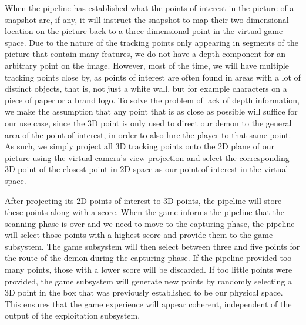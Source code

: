 
When the pipeline has established what the points of interest in the picture of a snapshot are, if any, it will instruct the snapshot to map their two dimensional location on the picture back to a three dimensional point in the virtual game space.
Due to the nature of the tracking points only appearing in segments of the picture that contain many features, we do not have a depth component for an arbitrary point on the image.
However, most of the time, we will have multiple tracking points close by, as points of interest are often found in areas with a lot of distinct objects, that is, not just a white wall, but for example characters on a piece of paper or a brand logo.
To solve the problem of lack of depth information, we make the assumption that any point that is as close as possible will suffice for our use case, since the 3D point is only used to direct our demon to the general area of the point of interest, in order to also lure the player to that same point.
As such, we simply project all 3D tracking points onto the 2D plane of our picture using the virtual camera's view-projection and select the corresponding 3D point of the closest point in 2D space as our point of interest in the virtual space.

After projecting its 2D points of interest to 3D points, the pipeline will store these points along with a score.
When the game informs the pipeline that the scanning phase is over and we need to move to the capturing phase, the pipeline will select those points with a highest score and provide them to the game subsystem.
The game subsystem will then select between three and five points for the route of the demon during the capturing phase.
If the pipeline provided too many points, those with a lower score will be discarded.
If too little points were provided, the game subsystem will generate new points by randomly selecting a 3D point in the box that was previously established to be our physical space.
This ensures that the game experience will appear coherent, independent of the output of the exploitation subsystem.
